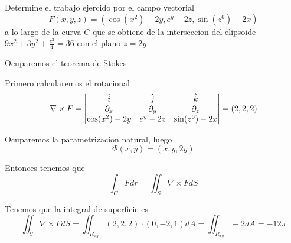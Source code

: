 \documentclass[../main.tex]{subfiles}
\begin{document}
\begin{problem}
  Determine el trabajo ejercido por el campo vectorial
  \begin{equation*}
    F(x, y, z) = (\cos(x^{2}) - 2y, e^{y} - 2z, \sin(z^{6}) - 2x)
  \end{equation*}
  a lo largo de la curva $C$ que se obtiene de la interseccion del elipsoide $9x^{2} + 3y^{2} + \frac{z^{2}}{4} = 36$ con el plano $z = 2y$
\end{problem}
\begin{solution}
Ocuparemos el teorema de Stokes

Primero calcularemos el rotacional
\begin{equation*}
  \nabla \times F = \begin{vmatrix} \hat{i} & \hat{j} & \hat{k}\\ \partial_x & \partial_y & \partial_z\\ \cos(x^{2}) - 2y & e^{y} - 2z & \sin(z^{6}) - 2x\end{vmatrix} = (2, 2, 2)
\end{equation*}

Ocuparemos la parametrizacion natural, luego
\begin{equation*}
  \Phi(x, y) = (x, y, 2y)
\end{equation*}

Entonces tenemos que
\begin{equation*}
  \int_{C} F dr = \iint_{S} \nabla \times F dS
\end{equation*}

Tenemos que la integral de superficie es
\begin{equation*}
  \iint_{S} \nabla \times F dS = \iint_{R_{xy}}(2, 2, 2) \cdot (0, -2, 1) dA = \iint_{R_{xy}} -2 dA = -12\pi
\end{equation*}

\end{solution}
\end{document}

